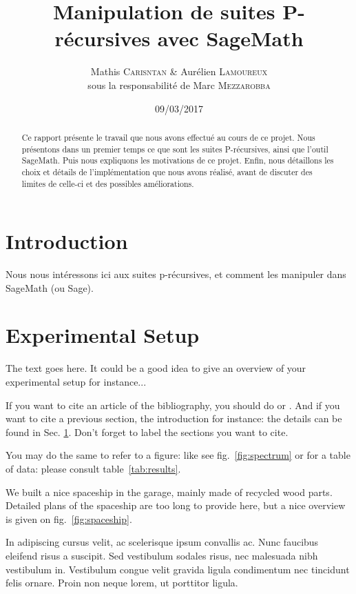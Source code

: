 \documentclass[final,12pt]{article}
\begin{document}
%
\title{Manipulation de suites P-récursives avec SageMath}
\author{Mathis \textsc{Carisntan} \& Aurélien \textsc{Lamoureux} \\ {\small sous la responsabilité de Marc \textsc{Mezzarobba}}}
%
\date{09/03/2017}

\maketitle
%
\begin{abstract}
    Ce rapport présente le travail que nous avons effectué au cours de ce projet.
    Nous présentons dans un premier temps ce que sont les suites P-récursives,
    ainsi que l'outil SageMath. Puis nous expliquons les motivations de ce projet.
    Enfin, nous détaillons les choix et détails de l'implémentation que nous avons réalisé,
    avant de discuter des limites de celle-ci et des possibles améliorations.
\end{abstract}

\section{Introduction}
    \label{intro}
    Nous nous intéressons ici aux suites p-récursives, et comment les manipuler dans SageMath (ou Sage). 

\section{Experimental Setup}

The text goes here. It could be a good idea to give an overview of your
experimental setup for instance...

If you want to cite an article of the bibliography, you should do
\cite{ipn-web} or \cite{Boh}. And if you want to cite a previous
section, the introduction for instance: the details can be found in
Sec. \ref{intro}. Don't forget to label the sections you want to
cite. 

You may do the same to refer to a figure: like see fig.~\ref{fig:spectrum}
or for a table of data: please consult table~\ref{tab:results}.

We built a nice spaceship in the garage, mainly made of recycled 
wood parts. Detailed plans of the spaceship are too long to provide
here, but a nice overview is given on fig.~\ref{fig:spaceship}.

In adipiscing cursus velit, ac scelerisque ipsum convallis ac. Nunc
faucibus eleifend risus a suscipit. Sed vestibulum sodales risus, nec
malesuada nibh vestibulum in. Vestibulum congue velit gravida ligula
condimentum nec tincidunt felis ornare. Proin non neque lorem, ut
porttitor ligula. 
\end{document}
